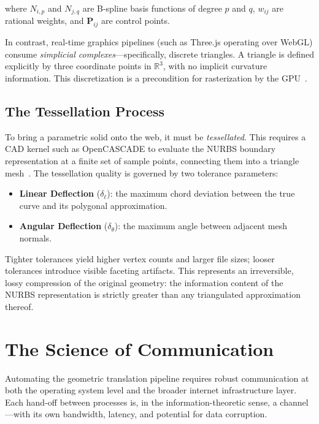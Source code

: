 \documentclass[conference]{IEEEtran}
\begin{document}
\noindent where $N_{i,p}$ and $N_{j,q}$ are B-spline basis functions of degree $p$ and $q$, $w_{ij}$ are rational weights, and $\mathbf{P}_{ij}$ are control points.

In contrast, real-time graphics pipelines (such as Three.js operating over WebGL) consume \textit{simplicial complexes}---specifically, discrete triangles. A triangle is defined explicitly by three coordinate points in $\mathbb{R}^3$, with no implicit curvature information. This discretization is a precondition for rasterization by the GPU~\cite{b_webgl}.

\subsection{The Tessellation Process}

To bring a parametric solid onto the web, it must be \textit{tessellated}. This requires a CAD kernel such as OpenCASCADE to evaluate the NURBS boundary representation at a finite set of sample points, connecting them into a triangle mesh~\cite{b_opencascade}. The tessellation quality is governed by two tolerance parameters:

\begin{itemize}
    \item \textbf{Linear Deflection} ($\delta_\ell$): the maximum chord deviation between the true curve and its polygonal approximation.
    \item \textbf{Angular Deflection} ($\delta_\theta$): the maximum angle between adjacent mesh normals.
\end{itemize}

\noindent Tighter tolerances yield higher vertex counts and larger file sizes; looser tolerances introduce visible faceting artifacts. This represents an irreversible, lossy compression of the original geometry: the information content of the NURBS representation is strictly greater than any triangulated approximation thereof.

\section{The Science of Communication}
\label{sec:communication}

Automating the geometric translation pipeline requires robust communication at both the operating system level and the broader internet infrastructure layer. Each hand-off between processes is, in the information-theoretic sense, a channel---with its own bandwidth, latency, and potential for data corruption.
\end{document}
